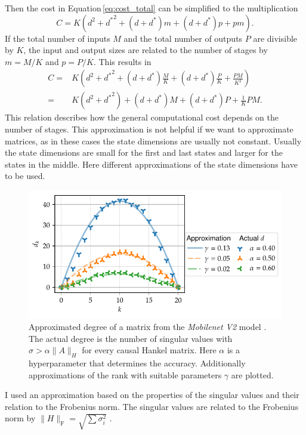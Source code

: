 \documentclass[doctype=mastersthesis,BCOR=15mm,biblatex]{ldvbook}%
\newcommand{\da}{d^*} %
\begin{document}
Then the cost in Equation\,\ref{eq:cost_total} can be simplified to the multiplication
\begin{equation}
C = K(d^2 + {\da}^2 + (d+\da)m +(d+\da)p +pm) 
.
\end{equation}
If the total number of inputs $M$ and the total number of outputs $P$ are divisible by $K$, the input and output sizes are related to the number of stages by $m = M/K$ and $p=P/K$.
This results in
\begin{align}
C =& K(d^2 + {\da}^2 + (d+\da)\frac{M}{K} +(d+\da)\frac{P}{K} +\frac{PM}{K^2}) \\
=&
K(d^2 + {\da}^2) + (d+\da)M +(d+\da)P +\frac{1}{K}PM 
.
\end{align}
This relation describes how the general computational cost depends on the number of stages.
This approximation is not helpful if we want to approximate matrices, as in these cases the state dimensions are usually not constant.
Usually the state dimensions are small for the first and last states and larger for the states in the middle.
Here different approximations of the state dimensions have to be used.
\begin{figure}[htb]
	\centering
	\includegraphics[width=\textwidth]{Plots/approx_degree.pdf}
	\caption{Approximated degree of a matrix from the \emph{Mobilenet V2} model \cite{sandler_mobilenetv2_2019}.
		The actual degree is the number of singular values with $\sigma > \alpha \|A\|_H$ for every causal Hankel matrix. Here $\alpha$ is a hyperparameter that determines the accuracy.
		Additionally approximations of the rank with suitable parameters $\gamma$ are plotted.}
	\label{fig:approx_degree}
\end{figure}
I used an approximation based on the properties of the singular values and their relation to the Frobenius norm.
The singular values are related to the Frobenius norm by $\|H\|_\text{F} = \sqrt{\sum \sigma_i^2}$ \cite[p.~67]{bai_matrix_2021}.
\end{document}
